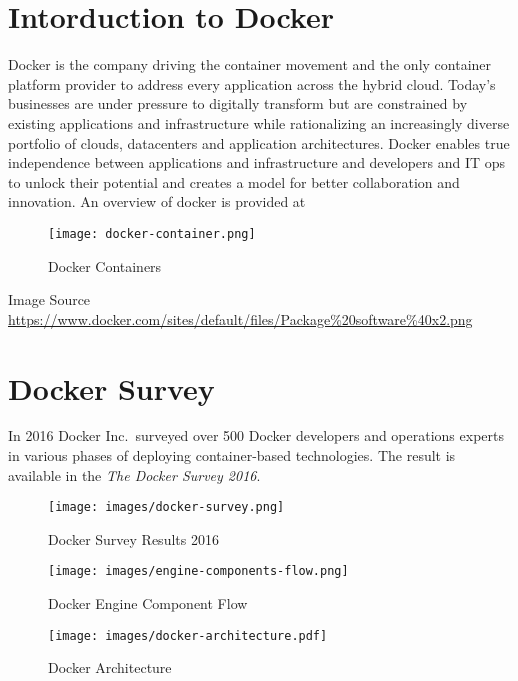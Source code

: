 
\FILENAME

\section{Intorduction to Docker}
\label{Docker}

Docker is the company driving the container movement and the only
container platform provider to address every application across the
hybrid cloud. Today's businesses are under pressure to digitally
transform but are constrained by existing applications and
infrastructure while rationalizing an increasingly diverse portfolio
of clouds, datacenters and application architectures. Docker enables
true independence between applications and infrastructure and
developers and IT ops to unlock their potential and creates a model
for better collaboration and innovation. An overview of docker is
provided at


\begin{figure}[htbp]
\centering
\texttt{[image: docker-container.png]}
\caption{Docker Containers}
\end{figure}

Image Source
\url{https://www.docker.com/sites/default/files/Package\%20software\%40x2.png}


\section{Docker Survey}

In 2016 Docker Inc.\ surveyed over 500 Docker developers and operations
experts in various phases of deploying container-based
technologies. The result is available in the \textit{The Docker Survey
  2016}.


\begin{figure}[htb]
\centering
\texttt{[image: images/docker-survey.png]}
\caption{Docker Survey Results 2016
}
\end{figure}


\begin{figure}[htb]
\centering
\texttt{[image: images/engine-components-flow.png]}
\caption{ Docker Engine Component Flow }
\end{figure}

\begin{figure}[htb]
\centering
\texttt{[image: images/docker-architecture.pdf]}
\caption{ Docker Architecture }
\end{figure}